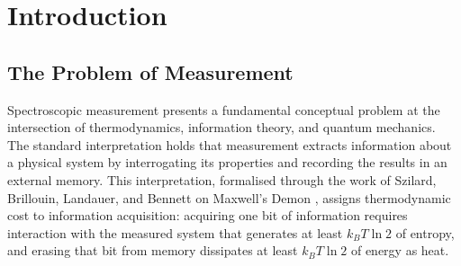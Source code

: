 \documentclass[twocolumn,10pt,a4paper]{article}
\theoremstyle{definition}
\theoremstyle{remark}
\begin{document}
\begin{abstract}
The framework predicts autocatalytic structure in spectroscopic measurement: each resonant coupling event creates categorical burden that facilitates subsequent measurements. This prediction explains signal averaging enhancement, coherent spectroscopy advantages, and multi-dimensional correlation spectroscopy, where each spectral dimension primes the partition structure for richer information extraction in subsequent dimensions. Virtual instruments, implemented through software-defined signal processing on fixed hardware oscillators, inherit this autocatalytic structure and achieve spectroscopic capability without dedicated optical or magnetic components.

The unification establishes that the historical term ``Molecular Maxwell Demon,'' used to describe molecular recognition and selectivity, should be understood as information catalysis through categorical apertures. No demon exists because no information processing occurs. Molecular specificity arises from geometric complementarity between aperture and substrate, enabling partition completion that generates rather than extracts information about molecular structure.

\textbf{Keywords:} information catalysis, categorical apertures, partition completion, Maxwell's Demon, resonant coupling, virtual spectrometers, phase-lock networks, autocatalytic measurement
\end{abstract}

\tableofcontents
\newpage

\section{Introduction}
\label{sec:introduction}

\subsection{The Problem of Measurement}

Spectroscopic measurement presents a fundamental conceptual problem at the intersection of thermodynamics, information theory, and quantum mechanics. The standard interpretation holds that measurement extracts information about a physical system by interrogating its properties and recording the results in an external memory. This interpretation, formalised through the work of Szilard, Brillouin, Landauer, and Bennett on Maxwell's Demon \citep{szilard1929, brillouin1951, landauer1961, bennett1982}, assigns thermodynamic cost to information acquisition: acquiring one bit of information requires interaction with the measured system that generates at least $k_B T \ln 2$ of entropy, and erasing that bit from memory dissipates at least $k_B T \ln 2$ of energy as heat.
\end{document}
